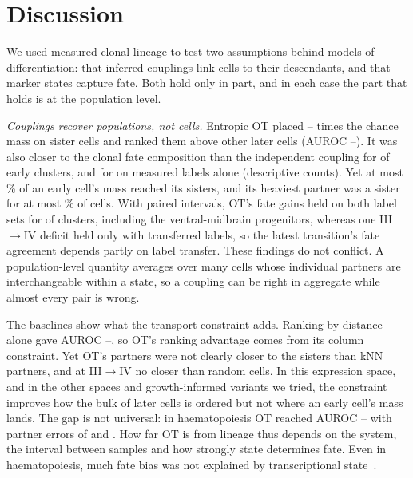 \documentclass[10pt,journal,compsoc]{IEEEtran}
\begin{document}
\section{Discussion}\label{sec:discussion}
We used measured clonal lineage to test two assumptions behind models of differentiation:
that inferred couplings link cells to their descendants, and that marker states capture
fate. Both hold only in part, and in each case the part that holds is at the population
level.

\emph{Couplings recover populations, not cells.} Entropic OT placed
\rqOneEnrMinT--\rqOneEnrMaxT{} times the chance mass on sister cells and ranked them above
other later cells (AUROC \rqOneAUROCMinT--\rqOneAUROCMaxT). It was also closer to the clonal
fate composition than the independent coupling for \fateNBetterAll{} of
\fateNClustersAll{} early clusters, and for \fateMeasNBetterAll{} on measured labels alone
(descriptive counts). Yet at most \rqOneMassPctMaxT\% of an early cell's mass
reached its sisters, and its heaviest partner was a sister for at most
\rqOneTopOnePctMaxT\% of cells. With paired intervals, OT's fate gains held on both label
sets for \fpBothBetter{} of \fpNClusters{} clusters, including the ventral-midbrain
progenitors, whereas one III$\to$IV deficit held only with transferred labels, so the
latest transition's fate agreement depends partly on label transfer. These findings do not
conflict. A population-level quantity averages over many cells whose individual partners
are interchangeable within a state, so a coupling can be right in aggregate while almost
every pair is wrong.

The baselines show what the transport constraint adds. Ranking by distance alone gave AUROC
\gaussAUROCMin--\gaussAUROCMax, so OT's ranking advantage comes from its column
constraint. Yet OT's partners were not clearly closer to the sisters than kNN partners, and at
III$\to$IV no closer than random cells. In this expression space, and in the other spaces
and growth-informed variants we tried, the constraint improves how the bulk of later cells
is ordered but not where an early cell's mass lands. The gap is not universal: in
haematopoiesis OT reached AUROC \larryAUROCA--\larryAUROCB{} with partner errors of
\larryRA{} and \larryRB. How far OT is from lineage thus depends on the system, the
interval between samples and how strongly state determines fate. Even in haematopoiesis,
much fate bias was not explained by transcriptional state~\cite{Weinreb_2020}.
\end{document}
